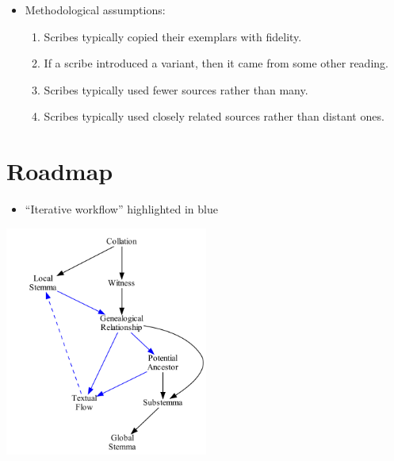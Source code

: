 \documentclass[10pt]{beamer}
\begin{document}
	\begin{frame}
		\begin{itemize}
			\item Methodological assumptions:
			\begin{enumerate}
				\item Scribes typically copied their exemplars with fidelity.
				\item If a scribe introduced a variant, then it came from some other reading.
				\item Scribes typically used fewer sources rather than many.
				\item Scribes typically used closely related sources rather than distant ones.
			\end{enumerate}
		\end{itemize}
	\end{frame}
	\section*{Roadmap}
	\begin{frame}
		\begin{itemize}
			\item ``Iterative workflow'' highlighted in blue
		\end{itemize}
		\begin{center}
			\includegraphics[width=0.5\textwidth]{../img/roadmap.pdf}
		\end{center}
	\end{frame}
\end{document}
